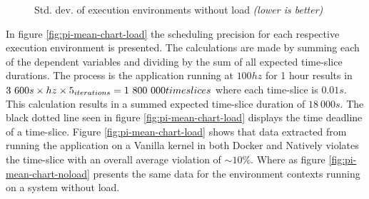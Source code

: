 \mydatanoload
\begin{figure}[ht]
\caption{Std. dev. of execution environments without load \textit{(lower is better)}}
\label{fig:pi-std-chart-noload}
\end{figure}




In figure \ref{fig:pi-mean-chart-load} the scheduling precision for each respective execution environment is presented. The calculations are made by summing each of the dependent variables and dividing by the sum of all expected time-slice durations. The process is the application running at $100hz$ for 1 hour results in $3\ 600s \times hz \times 5_{iterations}=1\ 800\ 000 time\-slices$ where each time-slice is $0.01s$. This calculation results in a summed expected time-slice duration of $18\ 000s$. The black dotted line seen in figure \ref{fig:pi-mean-chart-load} displays the time deadline of a time-slice. Figure \ref{fig:pi-mean-chart-load} shows that data extracted from running the application on a Vanilla kernel in both Docker and Natively violates the time-slice with an overall average violation of $\sim10\%$. Where as figure \ref{fig:pi-mean-chart-noload} presents the same data for the environment contexts running on a system without load.




